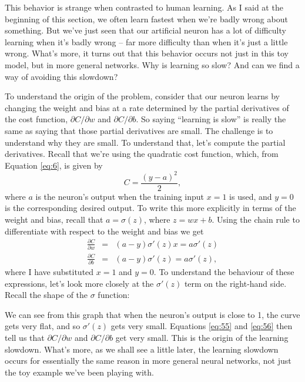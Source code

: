 \documentclass[a4paper,twoside,10pt]{book}
\begin{document}
This behavior is strange when contrasted to human learning. As I said at the beginning of this section, we often learn fastest when we're badly wrong about something. But we've just seen that our artificial neuron has a lot of difficulty learning when it's badly wrong -- far more difficulty than when it's just a little wrong. What's more, it turns out that this behavior occurs not just in this toy model, but in more general networks. Why is learning so slow? And can we find a way of avoiding this slowdown?

To understand the origin of the problem, consider that our neuron learns by changing the weight and bias at a rate determined by the partial derivatives of the cost function, $\partial{}C/\partial{}w$ and $\partial{}C/\partial{}b$. So saying ``learning is slow'' is really the same as saying that those partial derivatives are small. The challenge is to understand why they are small. To understand that, let's compute the partial derivatives. Recall that we're using the quadratic cost function, which, from Equation \ref{eq:6}, is given by
\begin{equation}
C = \frac{(y-a)^2}2,\label{eq:54}
\end{equation}
where $a$ is the neuron's output when the training input $x=1$ is used, and $y=0$ is the corresponding desired output. To write this more explicitly in terms of the weight and bias, recall that $a=\sigma{}(z)$, where $z=wx+b$. Using the chain rule to differentiate with respect to the weight and bias we get
\begin{eqnarray} 
\frac{\partial C}{\partial w} & = & (a-y)\sigma'(z) x = a \sigma'(z) \label{eq:55}\\
\frac{\partial C}{\partial b} & = & (a-y)\sigma'(z) = a \sigma'(z),
\label{eq:56}
\end{eqnarray}
where I have substituted $x=1$ and $y=0$. To understand the behaviour of these expressions, let's look more closely at the $\sigma{}'(z)$ term on the right-hand side. Recall the shape of the $\sigma{}$ function:


We can see from this graph that when the neuron's output is close to 1, the curve gets very flat, and so $\sigma{}'(z)$ gets very small. Equations \ref{eq:55} and \ref{eq:56} then tell us that $\partial{}C/\partial{}w$ and $\partial{}C/\partial{}b$ get very small. This is the origin of the learning slowdown. What's more, as we shall see a little later, the learning slowdown occurs for essentially the same reason in more general neural networks, not just the toy example we've been playing with.
\end{document}
